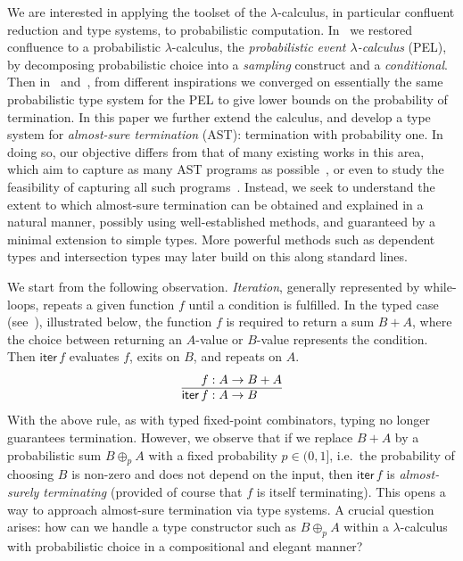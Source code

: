 \documentclass[a4paper,UKenglish,cleveref, autoref, thm-restate]{lipics-v2021}
\begin{document}
We are interested in applying the toolset of the $\lambda$-calculus, in particular confluent reduction and type systems, to probabilistic computation. In~\cite{DalLago-Guerrieri-Heijltjes-2020} we restored confluence to a probabilistic $\lambda$-calculus, the \emph{probabilistic event $\lambda$-calculus} (PEL), by decomposing probabilistic choice into a \emph{sampling} construct and a \emph{conditional}. Then in~\cite{Antonelli-DalLago-Pistone-2022} and~\cite{Heijltjes-Majury-2025}, from different inspirations we converged on essentially the same probabilistic type system for the PEL to give lower bounds on the probability of termination. In this paper we further extend the calculus, and develop a type system for \emph{almost-sure termination} (AST): termination with probability one. In doing so, our objective differs from that of many existing works in this area, which aim to capture as many AST programs as possible~\cite{DalLago-Grellois-2019,DalLago-Faggian-Ronchi-2021}, or even to study the feasibility of capturing all such programs~\cite{Kobayashi-DalLago-Grellois-2020}. Instead, we seek to understand the extent to which almost-sure termination can be obtained and explained in a natural manner, possibly using well-established methods, and guaranteed by a minimal extension to simple types. More powerful methods such as dependent types and intersection types may later build on this along standard lines.

We start from the following observation. \emph{Iteration}, generally represented by while-loops, repeats a given function $f$ until a condition is fulfilled. In the typed case (see~\cite{Bloom-Esik-1993}), illustrated  below, the function $f$ is required to return a sum $B+A$, where the choice between returning an $A$-value or $B$-value represents the condition. Then $\mathsf{iter}\,f$ evaluates $f$, exits on $B$, and repeats on $A$.
\[
\begin{array}{@{}r@{}l@{}}
	f &{}: A \to B+A
\\ \hline
	\mathsf{iter}\,f &{}: A\to B
\end{array}
\]
With the above rule, as with typed fixed-point combinators, typing no longer guarantees termination. However, we observe that if we replace $B+A$ by a probabilistic sum $B \oplus_p A$ with a fixed probability $p\in (0,1]$, i.e.\ the probability of choosing $B$ is non-zero and does not depend on the input, then $\mathsf{iter}\,f$ is \emph{almost-surely terminating} (provided of course that $f$ is itself terminating). This opens a way to approach almost-sure termination via type systems. A crucial question arises: how can we handle a type constructor such as $B\oplus_p A$ within a $\lambda$-calculus with probabilistic choice in a compositional and elegant manner?
\end{document}
